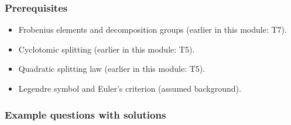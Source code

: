 \documentclass[11pt]{article}
\begin{document}
\subsubsection*{Prerequisites}
\begin{itemize}
  \item Frobenius elements and decomposition groups (earlier in this module: T7).
  \item Cyclotomic splitting (earlier in this module: T5).
  \item Quadratic splitting law (earlier in this module: T5).
  \item Legendre symbol and Euler's criterion (assumed background).
\end{itemize}

\subsubsection*{Example questions with solutions}
\end{document}
